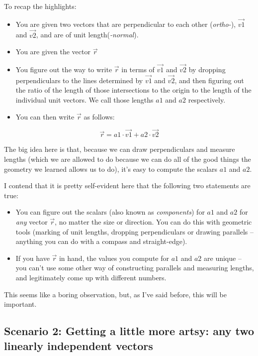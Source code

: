 \documentclass[
]{book}
\providecommand{\tightlist}{%
  \setlength{\itemsep}{0pt}\setlength{\parskip}{0pt}}
\begin{document}
To recap the highlights:

\begin{itemize}
\tightlist
\item
  You are given two vectors that are perpendicular to each other (\emph{ortho-}), \(\vec{v1}\) and \(\vec{v2}\), and are of unit length(\emph{-normal}).
\item
  You are given the vector \(\vec{r}\)
\item
  You figure out the way to write \(\vec{r}\) in terms of \(\vec{v1}\) and \(\vec{v2}\) by dropping perpendiculars to the lines determined by \(\vec{v1}\) and \(\vec{v2}\), and then figuring out the ratio of the length of those intersections to the origin to the length of the individual unit vectors. We call those lengths \(a1\) and \(a2\) respectively.
\item
  You can then write \(\vec{r}\) as follows:
\end{itemize}

\[\vec{r} = a1 \cdot \vec{v1} + a2 \cdot \vec{v2}\]

The big idea here is that, because we can draw perpendiculars and measure lengths (which we are allowed to do because we can do all of the good things the geometry we learned allows us to do), it's easy to compute the scalars \(a1\) and \(a2\).

I contend that it is pretty self-evident here that the following two statements are true:

\begin{itemize}
\tightlist
\item
  You can figure out the scalars (also known as \emph{components}) for \(a1\) and \(a2\) for \emph{any} vector \(\vec{r}\), no matter the size or direction. You can do this with geometric tools (marking of unit lengths, dropping perpendiculars or drawing parallels -- anything you can do with a compass and straight-edge).
\item
  If you have \(\vec{r}\) in hand, the values you compute for \(a1\) and \(a2\) are unique -- you can't use some other way of constructing parallels and measuring lengths, and legitimately come up with different numbers.
\end{itemize}

This seems like a boring observation, but, as I've said before, this will be important.

\hypertarget{scenario-2-getting-a-little-more-artsy-any-two-linearly-independent-vectors}{%
\subsection{Scenario 2: Getting a little more artsy: any two linearly independent vectors}\label{scenario-2-getting-a-little-more-artsy-any-two-linearly-independent-vectors}}
\end{document}
